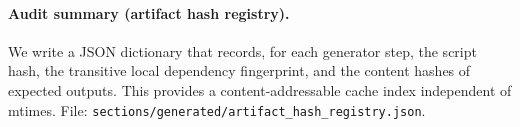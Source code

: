 \paragraph{Audit summary (artifact hash registry).} \AuditTag We write a JSON dictionary that records, for each generator step, the script hash, the transitive local dependency fingerprint, and the content hashes of expected outputs. This provides a content-addressable cache index independent of mtimes. File: \texttt{sections/generated/artifact_hash_registry.json}.